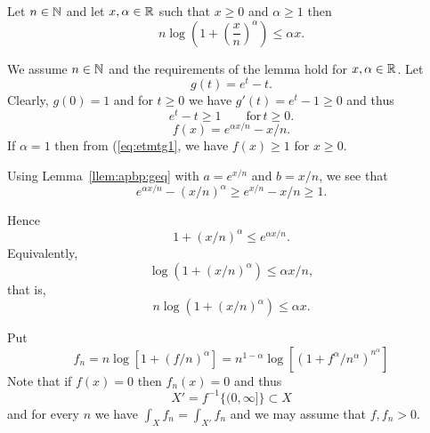 \begin{enumerate}
\begin{llem} \label{llem:nlogx:leq}
Let \(n\in\mathbb{N}\)
and let \(x,\alpha\in\mathbb{R}\) such that \(x\geq 0\) and \(\alpha\geq 1\)
then
\begin{equation}
n\log\left(1 + \left(\frac{x}{n}\right)^\alpha\right) \leq \alpha x.
\end{equation}
\end{llem}

\begin{thmproof}
We assume \(n\in\mathbb{N}\) and the requirements of the lemma hold for
\(x,\alpha\in\mathbb{R}\).
Let
\begin{displaymath}
g(t) = e^t - t.
\end{displaymath}
Clearly, \(g(0)=1\) and for \(t\geq 0\)
we have \(g'(t) = e^t - 1 \geq 0\) and thus
\begin{equation} \label{eq:etmtg1}
e^t - t \geq 1 \qquad \textrm{for}\, t\geq 0.
\end{equation}
\begin{displaymath}
f(x) = e^{\alpha x/n} - x/n.
\end{displaymath}
If \(\alpha=1\) then from (\ref{eq:etmtg1}, we have \(f(x)\geq 1\)
for \(x\geq 0\).

Using Lemma~\ref{llem:apbp:geq}
with \(a=e^{x/n}\) and \(b=x/n\),
we see that
\begin{equation*}
e^{\alpha x/n} - (x/n)^\alpha \geq e^{x/n} - x/n \geq 1.
\end{equation*}

Hence
\begin{equation*}
1 + (x/n)^\alpha \leq e^{\alpha x/n}.
\end{equation*}
Equivalently,
\begin{equation*}
\log\left(1 + (x/n)^\alpha\right) \leq \alpha x/n,
\end{equation*}
that is,
\begin{equation*}
n\log\left(1 + (x/n)^\alpha\right) \leq \alpha x.
\end{equation*}
\end{thmproof}


Put
\begin{equation*}
f_n = n\log\left[ 1 + (f/n)^\alpha\right]
    = n^{1-\alpha}
      \log\left[\left(1 + f^\alpha/n^\alpha\right)^{n^\alpha}\right]
\end{equation*}
Note that if \(f(x)=0\) then \(f_n(x)=0\) and thus
\begin{equation*}
X' = f^{-1}\{(0,\infty]\}\subset X
\end{equation*}
and for every $n$ we have \(\int_X f_n = \int_{X'} f_n\)
and we may assume that \(f,f_n > 0\).


\end{enumerate}
